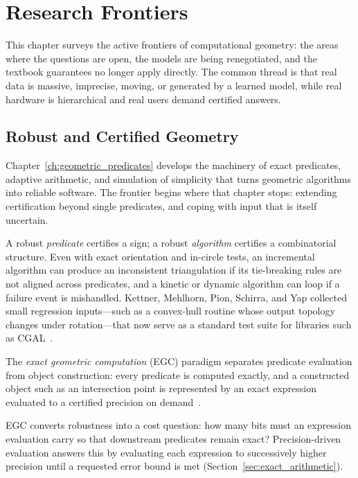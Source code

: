 \chapter{Research Frontiers}
\label{ch:research_frontiers}

This chapter surveys the active frontiers of computational geometry: the areas
where the questions are open, the models are being renegotiated, and the
textbook guarantees no longer apply directly. The common thread is that real
data is massive, imprecise, moving, or generated by a learned model, while
real hardware is hierarchical and real users demand certified answers.

\section{Robust and Certified Geometry}
\label{sec:frontiers_robust}

Chapter~\ref{ch:geometric_predicates} develops the machinery of exact
predicates, adaptive arithmetic, and simulation of simplicity that turns
geometric algorithms into reliable software. The frontier begins where that
chapter stops: extending certification beyond single predicates, and coping
with input that is itself uncertain.

A robust \emph{predicate} certifies a sign; a robust \emph{algorithm} certifies
a combinatorial structure. Even with exact orientation and in-circle tests, an
incremental algorithm can produce an inconsistent triangulation if its
tie-breaking rules are not aligned across predicates, and a kinetic or dynamic
algorithm can loop if a failure event is mishandled. Kettner, Mehlhorn, Pion,
Schirra, and Yap collected small regression inputs---such as a convex-hull
routine whose output topology changes under rotation---that now serve as a
standard test suite for libraries such as CGAL~\cite{kettner2008}.

\begin{definition}\label{def:frontiers_egc}
The \emph{exact geometric computation} (EGC) paradigm separates predicate
evaluation from object construction: every predicate is computed exactly, and a
constructed object such as an intersection point is represented by an exact
expression evaluated to a certified precision on demand~\cite{yap1997,halperin2004}.
\end{definition}

EGC converts robustness into a cost question: how many bits must an expression
evaluation carry so that downstream predicates remain exact? Precision-driven
evaluation answers this by evaluating each expression to successively higher
precision until a requested error bound is met (Section~\ref{sec:exact_arithmetic}).

